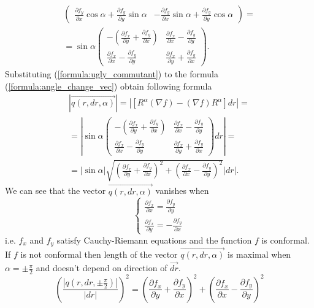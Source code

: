 \documentclass{article}
\newcommand{\vect}{\overrightarrow}
\begin{document}
\begin{multline}
\begin{pmatrix}
    \frac{\partial f_y}{\partial x} \cos \alpha + \frac{\partial f_y}{\partial y} \sin \alpha &
    - \frac{\partial f_y}{\partial x} \sin \alpha + \frac{\partial f_y}{\partial y} \cos \alpha 
  \end{pmatrix} = \\
  = \sin \alpha \begin{pmatrix}
    -(\frac{\partial f_x}{\partial y} + \frac{\partial f_y}{\partial x}) &
    \frac{\partial f_x}{\partial x} - \frac{\partial f_y}{\partial y} \\
    \frac{\partial f_x}{\partial x} - \frac{\partial f_y}{\partial y} &
    \frac{\partial f_x}{\partial y} + \frac{\partial f_y}{\partial x} 
  \end{pmatrix}.
\end{multline}
Substituting (\ref{formula:ugly_commutant}) to the formula (\ref{formula:angle_change_vec}) obtain following formula
\begin{multline*} 
  \left| \vect{q(r, dr, \alpha)} \right| = \left| \left[R^\alpha (\nabla f) - (\nabla f) R^\alpha \right] dr \right| = \\
  = \left| \sin \alpha \begin{pmatrix}
    -(\frac{\partial f_x}{\partial y} + \frac{\partial f_y}{\partial x}) &
    \frac{\partial f_x}{\partial x} - \frac{\partial f_y}{\partial y} \\
    \frac{\partial f_x}{\partial x} - \frac{\partial f_y}{\partial y} &
    \frac{\partial f_x}{\partial y} + \frac{\partial f_y}{\partial x} 
  \end{pmatrix} dr \right| = \\
  = |\sin \alpha| \sqrt{\left(\frac{\partial f_x}{\partial y} + \frac{\partial f_y}{\partial x}\right)^2 + \left(\frac{\partial f_x}{\partial x} - \frac{\partial f_y}{\partial y}\right)^2} \left| dr \right|.
\end{multline*}
We can see that the vector $\vect{q(r, dr, \alpha)}$ vanishes when 
$$\begin{cases}
  \frac{\partial f_x}{\partial x} = \frac{\partial f_y}{\partial y} \\
  \frac{\partial f_x}{\partial y} = -\frac{\partial f_y}{\partial x} 
\end{cases}$$
i.e. $f_x$ and $f_y$ satisfy Cauchy-Riemann equations and the function $f$ is conformal. If $f$ is not conformal then length of the vector $\vect{q(r, dr, \alpha)}$ is maximal when $\alpha = \pm \frac{\pi}{2}$ 
and doesn't depend on direction of $\vect{dr}$. 
\begin{equation*}
  \left(\frac{\left| {q(r, dr, \pm \frac{\pi}{2})} \right|}{|dr|}\right)^2 = 
  \left(\frac{\partial f_x}{\partial y} + \frac{\partial f_y}{\partial x}\right)^2 + \left(\frac{\partial f_x}{\partial x} - \frac{\partial f_y}{\partial y}\right)^2 
\end{equation*}
\end{document}

